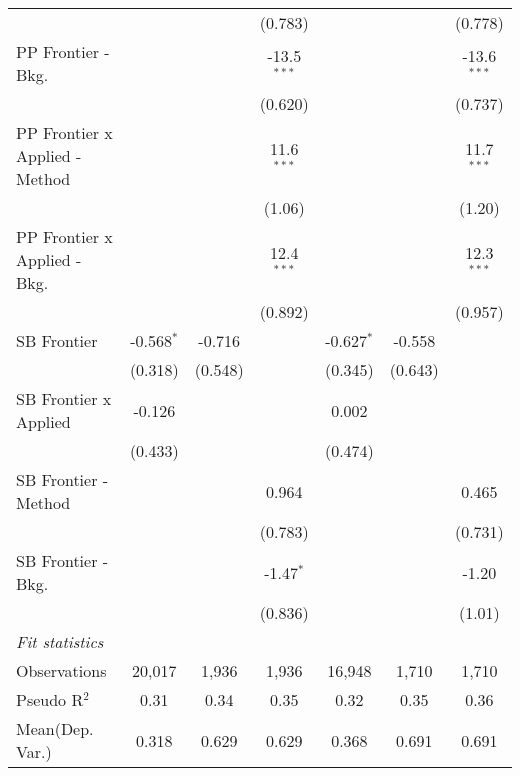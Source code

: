 \begin{tabular}{lcccccc}
                                  &                &               & (0.783)       &               &               & (0.778)\\   
   PP Frontier - Bkg.             &                &               & -13.5$^{***}$ &               &               & -13.6$^{***}$\\   
                                  &                &               & (0.620)       &               &               & (0.737)\\   
   PP Frontier x Applied - Method &                &               & 11.6$^{***}$  &               &               & 11.7$^{***}$\\   
                                  &                &               & (1.06)        &               &               & (1.20)\\   
   PP Frontier x Applied - Bkg.   &                &               & 12.4$^{***}$  &               &               & 12.3$^{***}$\\   
                                  &                &               & (0.892)       &               &               & (0.957)\\   
   SB Frontier                    & -0.568$^{*}$   & -0.716        &               & -0.627$^{*}$  & -0.558        &   \\   
                                  & (0.318)        & (0.548)       &               & (0.345)       & (0.643)       &   \\   
   SB Frontier x Applied          & -0.126         &               &               & 0.002         &               &   \\   
                                  & (0.433)        &               &               & (0.474)       &               &   \\   
   SB Frontier - Method           &                &               & 0.964         &               &               & 0.465\\   
                                  &                &               & (0.783)       &               &               & (0.731)\\   
   SB Frontier - Bkg.             &                &               & -1.47$^{*}$   &               &               & -1.20\\   
                                  &                &               & (0.836)       &               &               & (1.01)\\   
   \midrule
   \emph{Fit statistics}\\
   Observations                   & 20,017         & 1,936         & 1,936         & 16,948        & 1,710         & 1,710\\  
   Pseudo R$^2$                   & 0.31           & 0.34          & 0.35          & 0.32          & 0.35          & 0.36\\  
Mean(Dep. Var.) & 0.318 & 0.629 & 0.629 & 0.368 & 0.691 & 0.691 \\
   

\end{tabular}
